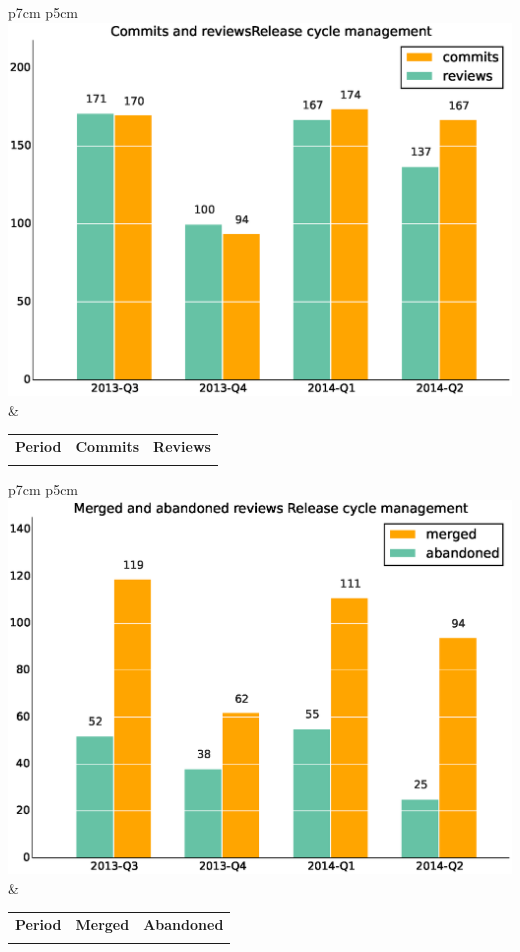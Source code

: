 \documentclass[a4wide,11pt]{report}
\begin{document}
\begin{tabular}{p{7cm} p{5cm}}
    \vspace{0pt} 
    \includegraphics[scale=.35]{figs/commitsReleasecyclemanagement.eps}
    & 
    \vspace{0pt}
    \begin{tabular}{l|r|r|}%
    \bfseries Period & \bfseries Commits & \bfseries Reviews %
    \csvreader[head to column names]{data/commitsReleasecyclemanagement.csv}{}%
    {\\ & \commits & \submitted}
    \end{tabular}
\end{tabular}

\begin{tabular}{p{7cm} p{5cm}}
    \vspace{0pt} 
    \includegraphics[scale=.35]{figs/submitted_reviewsReleasecyclemanagement.eps}
    & 
    \vspace{0pt}
    \begin{tabular}{l|r|r|}%
    \bfseries Period & \bfseries Merged & \bfseries Abandoned %
    \csvreader[head to column names]{data/submitted_reviewsReleasecyclemanagement.csv}{}%
    {\\ & \merged & \abandoned}
    \end{tabular}
\end{tabular}
\end{document}
